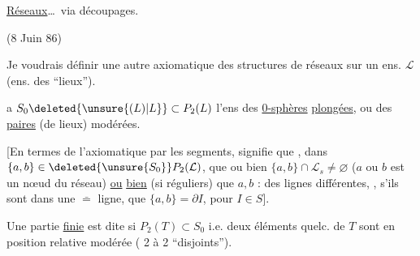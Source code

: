 
\uline{Réseaux}\ldots\ via découpages.

(8 Juin 86)



Je voudrais définir une autre axiomatique des 
 structures de réseaux
sur un ens. $\mathcal L$ (ens. des ``lieux'').

\textcircled{\scriptsize a}\quad $S_0\deleted{\unsure{(L)|L}}\subset P_2(L)$ l'ens des \uline{0-sphères}
\uline{plongées}, ou des \uline{paires}  (de
lieux) modérées. 


[En termes de l'axiomatique par les segments,
 signifie que  ,
 dans $\{a,b\}\in\deleted{\unsure{S_0}}P_2(\mathcal L)$, que
ou bien $\{a,b\}\cap\mathcal L_s\ne\varnothing$ ($a$ ou $b$ est un
nœud  du réseau) \uline{ou} \uline{bien} 
(si   réguliers) que $a,b$   :
des lignes différentes, , s'ils sont
dans une $\bar{=}$ ligne, que $\{a,b\}=\partial I$,
pour $I\in S$].

 Une partie \uline{finie}  est dite  
si  $P_2(T)\subset S_0$
i.e. deux éléments quelc. de $T$ sont en
position relative modérée ( 2 à 2 ``disjoints'').



